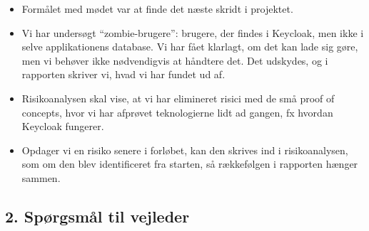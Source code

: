 \documentclass[a4paper,11pt]{article}
\begin{document}
\begin{itemize}
    \item Formålet med mødet var at finde det næste skridt i projektet.
    \item Vi har undersøgt ``zombie-brugere'': brugere, der findes i Keycloak, men ikke i selve applikationens database. Vi har fået klarlagt, om det kan lade sig gøre, men vi behøver ikke nødvendigvis at håndtere det. Det udskydes, og i rapporten skriver vi, hvad vi har fundet ud af.
    \item Risikoanalysen skal vise, at vi har elimineret risici med de små proof of concepts, hvor vi har afprøvet teknologierne lidt ad gangen, fx hvordan Keycloak fungerer.
    \item Opdager vi en risiko senere i forløbet, kan den skrives ind i risikoanalysen, som om den blev identificeret fra starten, så rækkefølgen i rapporten hænger sammen.
\end{itemize}

\subsection*{2. Spørgsmål til vejleder}
\end{document}
